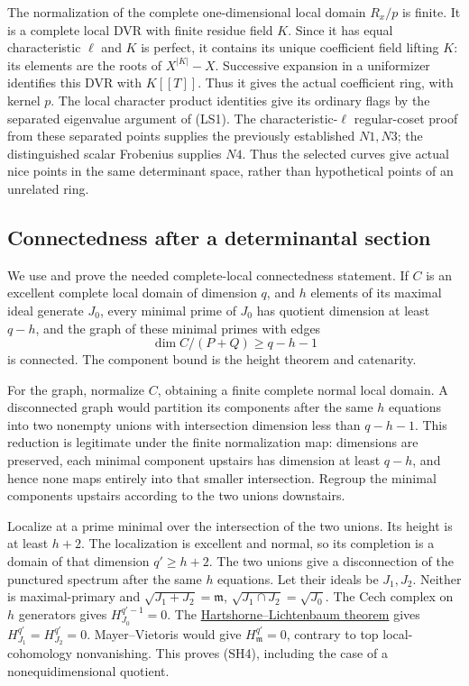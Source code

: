 The normalization of the complete
one-dimensional local domain \(R_x/p\)
is finite.
It is a complete local DVR with finite
residue field \(K\).
Since it has equal characteristic \(\ell\)
and \(K\) is perfect, it contains its unique
coefficient field lifting \(K\): its elements
are the roots of \(X^{|K|}-X\).
Successive expansion in a uniformizer identifies
this DVR with \(K[[T]]\).
Thus it gives the actual 
coefficient ring, with kernel \(p\).
The local character product identities
give its ordinary flags by the separated
eigenvalue argument of (LS1).
The characteristic-\(\ell\) regular-coset
proof from these separated points supplies
the previously established \(N1,N3\);
the distinguished scalar Frobenius
supplies \(N4\).
Thus the selected curves give actual
nice points in the same determinant
space, rather than hypothetical points
of an unrelated ring.

\subsection{Connectedness after a determinantal section}
We use and prove the needed complete-local
connectedness statement.
If \(C\) is an excellent complete local
domain of dimension \(q\), and \(h\)
elements of its maximal ideal generate
\(J_0\), every minimal prime of \(J_0\)
has quotient dimension at least \(q-h\),
and the graph of these minimal primes
with edges
\[
                        \dim C/(P+Q)\ge q-h-1                \tag{SH4}
\]
is connected.
The component bound is the height theorem
and catenarity.

For the graph, normalize \(C\), obtaining
a finite complete normal local domain.
A disconnected graph would partition its
components after the same \(h\) equations
into two nonempty unions with intersection
dimension less than \(q-h-1\).
This reduction is legitimate under the
finite normalization map: dimensions are
preserved, each minimal component upstairs
has dimension at least \(q-h\), and hence
none maps entirely into that smaller
intersection.
Regroup the minimal components upstairs
according to the two unions downstairs.

Localize at a prime minimal over the
intersection of the two unions.
Its height is at least \(h+2\).
The localization is excellent and normal,
so its completion is a domain of that
dimension \(q'\ge h+2\).
The two unions give a disconnection of
the punctured spectrum after the same
\(h\) equations.
Let their ideals be \(J_1,J_2\).
Neither is maximal-primary and
\(\sqrt{J_1+J_2}=\mathfrak m\),
\(\sqrt{J_1\cap J_2}=\sqrt{J_0}\).
The Cech complex on \(h\) generators
gives \(H^{q'-1}_{J_0}=0\).
The
\href{https://stacks.math.columbia.edu/tag/0EB0}
{Hartshorne--Lichtenbaum theorem}
gives \(H^{q'}_{J_1}=H^{q'}_{J_2}=0\).
Mayer--Vietoris would give
\(H^{q'}_{\mathfrak m}=0\), contrary
to top local-cohomology nonvanishing.
This proves (SH4), including the case
of a nonequidimensional quotient.

